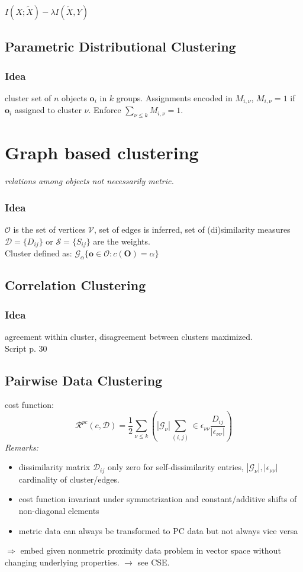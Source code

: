 \documentclass[9pt,parskip]{scrartcl}
\begin{document}
\begin{multicols*}{4}
$ I(X; \tilde{X}) - \lambda I(\tilde{X}, Y)$

\subsection*{Parametric Distributional Clustering}
\subsubsection*{Idea}
cluster set of $n$ objects $\mathbf{o}_i$ in $k$ groups. Assignments encoded in $M_{i, \nu}$, $M_{i, \nu} = 1$ if $\mathbf{o}_i$ assigned to cluster $\nu$. Enforce $\sum_{\nu \leq k} M_{i, \nu} = 1$.

\section*{Graph based clustering}
\textit{relations among objects not necessarily metric.}
\subsubsection*{Idea}
$\mathcal{O}$ is the set of vertices $\mathcal{V}$, set of edges is inferred, set of (di)similarity measures $\mathcal{D}=\{D_{ij}\}$ or $\mathcal{S}=\{S_{ij}\}$ are the weights. \\
Cluster defined as: $\mathcal{G}_{\alpha} \{ \mathbf{o} \in \mathcal{O} : c( \mathbf{O}) = \alpha\}$
\subsection*{Correlation Clustering}
\subsubsection*{Idea}
agreement within cluster, disagreement between clusters maximized. \\
Script p. 30
\subsection*{Pairwise Data Clustering}
cost function: 
\[\mathcal{R}^{pc}(c, \mathcal{D}) = \frac 1 2 \sum_{\nu \leq k} \left( |\mathcal{G}_{\nu}| \sum_{(i,j)} \in \epsilon_{\nu \nu} \frac{D_{ij}}{|\epsilon_{\nu \nu}|} \right) \]
\textit{Remarks:} 
\begin{itemize}
	\item dissimilarity matrix $\mathcal{D}_{ij}$ only zero for self-dissimilarity entries, $|\mathcal{G}_{\nu}|, |\epsilon_{\nu \nu}|$ cardinality of cluster/edges. 
	\item cost function invariant under symmetrization and constant/additive shifts of non-diagonal elements
	\item metric data can always be transformed to PC data but not always vice versa
\end{itemize}
$ \Rightarrow $ embed given nonmetric proximity data problem in vector space without changing underlying properties. $\rightarrow$ see CSE.

\end{multicols*}
\end{document}
